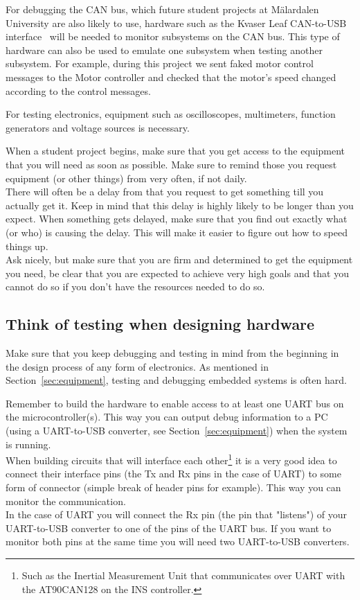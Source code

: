 For debugging the CAN bus, which future student projects at M\"{a}lardalen University are also likely to use, hardware such as the Kvaser Leaf CAN-to-USB interface~\cite{web:kvaser_can} will be needed to monitor subsystems on the CAN bus. This type of hardware can also be used to emulate one subsystem when testing another subsystem. For example, during this project we sent faked motor control messages to the Motor controller and checked that the motor's speed changed according to the control messages.

For testing electronics, equipment such as oscilloscopes, multimeters, function generators and voltage sources is necessary.

When a student project begins, make sure that you get access to the equipment that you will need as soon as possible.  Make sure to remind those you request equipment (or other things) from very often, if not daily. \\
There will often be a delay from that you request to get something till you actually get it. Keep in mind that this delay is highly likely to be longer than you expect. When something gets delayed, make sure that you find out exactly what (or who) is causing the delay. This will make it easier to figure out how to speed things up. \\
Ask nicely, but make sure that you are firm and determined to get the equipment you need, be clear that you are expected to achieve very high goals and that you cannot do so if you don't have the resources needed to do so.


\subsection{Think of testing when designing hardware}\label{sec:testing}
Make sure that you keep debugging and testing in mind from the beginning in the design process of any form of electronics. As mentioned in Section~\ref{sec:equipment}, testing and debugging embedded systems is often hard. 

Remember to build the hardware to enable access to at least one UART bus on the microcontroller(s). This way you can output debug information to a PC (using a UART-to-USB converter, see Section~\ref{sec:equipment}) when the system is running. \\
When building circuits that will interface each other\footnote{Such as the Inertial Measurement Unit that communicates over UART with the AT90CAN128 on the INS controller.} it is a very good idea to connect their interface pins (the Tx and Rx pins in the case of UART) to some form of connector (simple break of header pins for example). This way you can monitor the communication. \\
In the case of UART you will connect the Rx pin (the pin that "listens") of your UART-to-USB converter to one of the pins of the UART bus. If you want to monitor both pins at the same time you will need two UART-to-USB converters.

